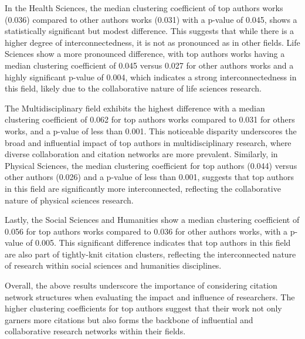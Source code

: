In the Health Sciences, the median clustering coefficient of top authors works
(0.036) compared to other authors works (0.031) with a p-value of 0.045, shows
a statistically significant but modest difference. This suggests that while
there is a higher degree of interconnectedness, it is not as pronounced as in
other fields. Life Sciences show a more pronounced difference, with top authors
works having a median clustering coefficient of 0.045 versus 0.027 for other
authors works and a highly significant p-value of 0.004, which indicates a
strong interconnectedness in this field, likely due to the collaborative nature
of life sciences research.

The Multidisciplinary field exhibits the highest difference with a median
clustering coefficient of 0.062 for top authors works compared to 0.031 for
others works, and a p-value of less than 0.001. This noticeable disparity
underscores the broad and influential impact of top authors in
multidisciplinary research, where diverse collaboration and citation networks
are more prevalent. Similarly, in Physical Sciences, the median clustering
coefficient for top authors (0.044) versus other authors (0.026) and a p-value
of less than 0.001, suggests that top authors in this field are significantly
more interconnected, reflecting the collaborative nature of physical sciences
research.

Lastly, the Social Sciences and Humanities show a median clustering coefficient
of 0.056 for top authors works compared to 0.036 for other authors works, with
a p-value of 0.005. This significant difference indicates that top authors in
this field are also part of tightly-knit citation clusters, reflecting the
interconnected nature of research within social sciences and humanities
disciplines.

Overall, the above results underscore the importance of considering citation
network structures when evaluating the impact and influence of researchers. The
higher clustering coefficients for top authors suggest that their work not only
garners more citations but also forms the backbone of influential and
collaborative research networks within their fields.
